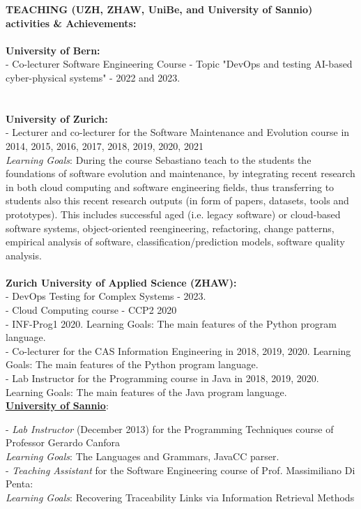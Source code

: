 \documentclass[10pt]{article}
\begin{document}
\textbf{TEACHING (UZH, ZHAW, UniBe, and University of Sannio) activities \& Achievements:}
\\\\
\textbf{University of Bern:} \\
-   Co-lecturer Software Engineering Course - Topic "DevOps and testing AI-based cyber-physical systems" - 2022 and 2023.\\  
\\\\
\textbf{University of Zurich:} \\
-   Lecturer and co-lecturer for the Software Maintenance and Evolution course in 2014, 2015, 2016, 2017, 2018, 2019, 2020, 2021\\   \textit{Learning Goals}: During the course Sebastiano teach to
the students the foundations of software evolution and maintenance, by integrating recent research in both cloud computing and
software engineering fields, thus transferring to students also this recent research outputs (in form of papers, datasets, tools and
prototypes). This includes successful aged (i.e. legacy software) or cloud-based software systems, object-oriented reengineering,
refactoring, change patterns, empirical analysis of software, classification/prediction models, software quality analysis.\\\\
\textbf{Zurich University of Applied Science (ZHAW):}\\
- DevOps Testing for Complex Systems - 2023.\\
- Cloud Computing course - CCP2 2020\\
- INF-Prog1 2020. Learning Goals: The main features of the Python program language.\\
- Co-lecturer for the CAS Information Engineering in 2018, 2019, 2020.
Learning Goals: The main features of the Python program language.\\
- Lab Instructor for the Programming course in Java in 2018, 2019, 2020.
Learning Goals: The main features of the Java program language.\\


\href{http://www.unisa.it}{\textbf{University of Sannio}}:

- \textit{Lab Instructor} (December 2013) for the Programming Techniques course of Professor Gerardo Canfora\\   \textit{Learning Goals}:   The Languages ​​and Grammars, JavaCC parser.\\
- \textit{Teaching Assistant } for the Software Engineering course of Prof. Massimiliano Di Penta:\\   \textit{Learning Goals}:   
Recovering Traceability Links via Information Retrieval Methods\\
\end{document}
